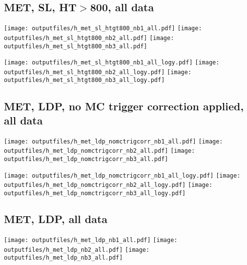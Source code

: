 \documentclass[11pt]{article}
\begin{document}
     \subsection{ MET, SL, HT$>$800, all data}

    \noindent
     \texttt{[image: outputfiles/h\_met\_sl\_htgt800\_nb1\_all.pdf]}
     \texttt{[image: outputfiles/h\_met\_sl\_htgt800\_nb2\_all.pdf]}
     \texttt{[image: outputfiles/h\_met\_sl\_htgt800\_nb3\_all.pdf]}

    \noindent
     \texttt{[image: outputfiles/h\_met\_sl\_htgt800\_nb1\_all\_logy.pdf]}
     \texttt{[image: outputfiles/h\_met\_sl\_htgt800\_nb2\_all\_logy.pdf]}
     \texttt{[image: outputfiles/h\_met\_sl\_htgt800\_nb3\_all\_logy.pdf]}






     \subsection{ MET, LDP, no MC trigger correction applied, all data}

    \noindent
     \texttt{[image: outputfiles/h\_met\_ldp\_nomctrigcorr\_nb1\_all.pdf]}
     \texttt{[image: outputfiles/h\_met\_ldp\_nomctrigcorr\_nb2\_all.pdf]}
     \texttt{[image: outputfiles/h\_met\_ldp\_nomctrigcorr\_nb3\_all.pdf]}

    \noindent
     \texttt{[image: outputfiles/h\_met\_ldp\_nomctrigcorr\_nb1\_all\_logy.pdf]}
     \texttt{[image: outputfiles/h\_met\_ldp\_nomctrigcorr\_nb2\_all\_logy.pdf]}
     \texttt{[image: outputfiles/h\_met\_ldp\_nomctrigcorr\_nb3\_all\_logy.pdf]}


    \subsection{ MET, LDP, all data}

    \noindent
     \texttt{[image: outputfiles/h\_met\_ldp\_nb1\_all.pdf]}
     \texttt{[image: outputfiles/h\_met\_ldp\_nb2\_all.pdf]}
     \texttt{[image: outputfiles/h\_met\_ldp\_nb3\_all.pdf]}
\end{document}
